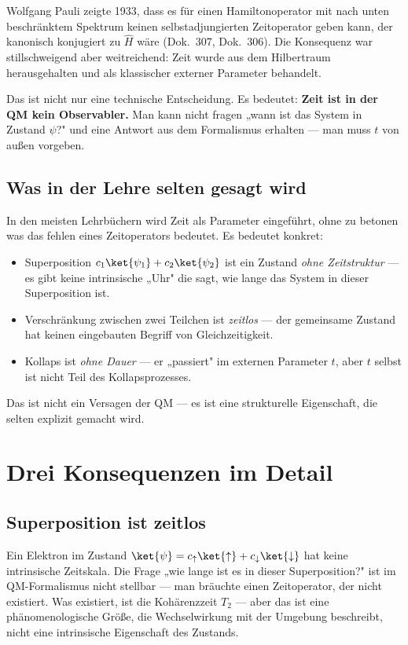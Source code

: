 Wolfgang Pauli zeigte 1933, dass es für einen Hamiltonoperator
mit nach unten beschränktem Spektrum keinen selbstadjungierten
Zeitoperator geben kann, der kanonisch konjugiert zu $\hat{H}$
wäre (Dok.~307, Dok.~306). Die Konsequenz war stillschweigend
aber weitreichend: Zeit wurde aus dem Hilbertraum
herausgehalten und als klassischer externer Parameter behandelt.

Das ist nicht nur eine technische Entscheidung. Es bedeutet:
\textbf{Zeit ist in der QM kein Observabler.} Man kann nicht
fragen „wann ist das System in Zustand $\psi$?" und eine
Antwort aus dem Formalismus erhalten — man muss $t$ von
außen vorgeben.

\subsection{Was in der Lehre selten gesagt wird}

In den meisten Lehrbüchern wird Zeit als Parameter eingeführt,
ohne zu betonen was das fehlen eines Zeitoperators bedeutet.
Es bedeutet konkret:

\begin{itemize}
  \item Superposition $c_1\ket{\psi_1}+c_2\ket{\psi_2}$ ist
    ein Zustand \emph{ohne Zeitstruktur} — es gibt keine
    intrinsische „Uhr" die sagt, wie lange das System in
    dieser Superposition ist.
  \item Verschränkung zwischen zwei Teilchen ist
    \emph{zeitlos} — der gemeinsame Zustand hat keinen
    eingebauten Begriff von Gleichzeitigkeit.
  \item Kollaps ist \emph{ohne Dauer} — er „passiert" im
    externen Parameter $t$, aber $t$ selbst ist nicht Teil
    des Kollapsprozesses.
\end{itemize}

Das ist nicht ein Versagen der QM — es ist eine strukturelle
Eigenschaft, die selten explizit gemacht wird.

\section{Drei Konsequenzen im Detail}

\subsection{Superposition ist zeitlos}

Ein Elektron im Zustand
$\ket{\psi} = c_\uparrow\ket{\uparrow} + c_\downarrow\ket{\downarrow}$
hat keine intrinsische Zeitskala. Die Frage „wie lange ist
es in dieser Superposition?" ist im QM-Formalismus nicht
stellbar — man bräuchte einen Zeitoperator, der nicht
existiert. Was existiert, ist die Kohärenzzeit $T_2$ — aber
das ist eine phänomenologische Größe, die Wechselwirkung mit
der Umgebung beschreibt, nicht eine intrinsische Eigenschaft
des Zustands.

